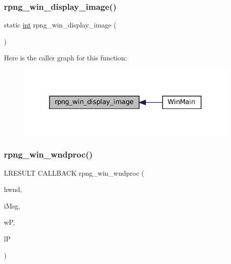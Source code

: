 \subsubsection{\texorpdfstring{rpng\+\_\+win\+\_\+display\+\_\+image()}{rpng\_win\_display\_image()}}
{\footnotesize\ttfamily static \mbox{\hyperlink{ioapi_8h_a787fa3cf048117ba7123753c1e74fcd6}{int}} rpng\+\_\+win\+\_\+display\+\_\+image (\begin{DoxyParamCaption}\item[{void}]{ }\end{DoxyParamCaption})\hspace{0.3cm}{\ttfamily [static]}}

Here is the caller graph for this function\+:
\nopagebreak
\begin{figure}[H]
\begin{center}
\leavevmode
\includegraphics[width=312pt]{rpng-win_8c_aaa8b69a6c5c9c2d35b7d67787a55e218_icgraph}
\end{center}
\end{figure}
\mbox{\label{rpng-win_8c_a1b1b264a2d9a35661c12289f38929843}} 
\subsubsection{\texorpdfstring{rpng\+\_\+win\+\_\+wndproc()}{rpng\_win\_wndproc()}}
{\footnotesize\ttfamily L\+R\+E\+S\+U\+LT C\+A\+L\+L\+B\+A\+CK rpng\+\_\+win\+\_\+wndproc (\begin{DoxyParamCaption}\item[{H\+W\+ND}]{hwnd,  }\item[{U\+I\+NT}]{i\+Msg,  }\item[{W\+P\+A\+R\+AM}]{wP,  }\item[{L\+P\+A\+R\+AM}]{lP }\end{DoxyParamCaption})}

